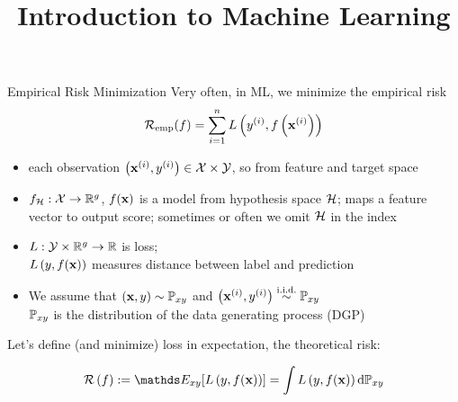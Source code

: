 \documentclass[11pt,compress,t,notes=noshow, xcolor=table]{beamer}
\title{Introduction to Machine Learning}
\begin{document}
    

\begin{vbframe}{Empirical Risk Minimization}
Very often, in ML, we minimize the empirical risk
\vspace{-0.3cm}
$$\mathcal{R}_{\text{emp}}(f) = \sum\limits_{i=1}^n L\left(y^{(i)}, f\left(\mathbf{x}^{(i)}\right)\right)$$
\vspace{-0.2cm}
{\small
\begin{itemize}\setlength\itemsep{0.5pt} 
    \item each observation $\left(\mathbf{x}^{(i)}, y^{(i)}\right) \in  \mathcal{X} \times \mathcal{Y}$,
    so from feature and target space
    \item $f_{\mathcal{H}}:\mathcal{X} \rightarrow \mathbb{R}^g$, 
    $f(\mathbf{x})$ is a model from hypothesis space $\mathcal{H}$;
    maps a feature vector to output score;
    sometimes or often we omit $\mathcal{H}$ in the index 
    \item $L:\mathcal{Y}\times\mathbb{R}^g\rightarrow\mathbb{R}$ is loss;\\
    $L\left(y, f(\mathbf{x})\right)$ measures distance between label and prediction
    \item We assume that $(\mathbf{x},y) \sim \mathbb{P}_{xy}$ and $\left(\mathbf{x}^{(i)}, y^{(i)}\right)  \overset{\text{i.i.d.}}{\sim} \mathbb{P}_{xy}$ \\
    $\mathbb{P}_{xy}$ is the distribution of the data generating process (DGP)
\end{itemize}
}
Let's define (and minimize) loss in expectation, the theoretical risk:

$$ \risk \left(f\right) := \E_{xy} [\Lxy] = \int \Lxy \text{d}\Pxy $$
\end{vbframe}
\end{document}
